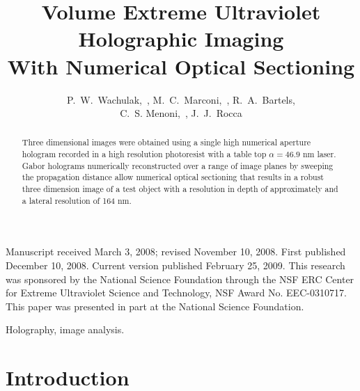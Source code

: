 \documentclass[]{IEEEphot}
\begin{document}
\title{Volume Extreme Ultraviolet Holographic Imaging\\ With Numerical Optical Sectioning}

\author{P.~W.~Wachulak,~, M.~C.~Marconi,~,  
R.~A.~Bartels,\\ 
C.~S. Menoni,~, J.~J.~Rocca}


%

\maketitle


\begin{receivedinfo}%
Manuscript received March 3, 2008; revised November 10, 2008. First published December 10, 2008. Current version published February 25, 2009. This research was sponsored by the National Science Foundation through the NSF ERC Center for Extreme Ultraviolet Science and Technology, NSF Award No. EEC-0310717. This paper was presented in part at the National Science Foundation.
\end{receivedinfo}

\begin{abstract}
Three dimensional images were obtained using a single high numerical aperture hologram recorded in a high resolution photoresist with a table top $\alpha = 46.9$ nm laser. Gabor holograms numerically reconstructed over a range of image planes by sweeping the propagation distance allow numerical optical sectioning that results in a robust three dimension image of a test object with a resolution in depth of approximately and a lateral resolution of 164 nm. 
\end{abstract}

\begin{IEEEkeywords}
Holography, image analysis.
\end{IEEEkeywords}

\section{Introduction}
\end{document}
